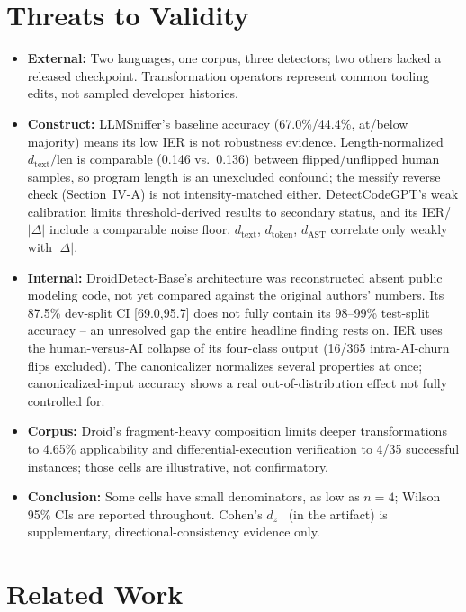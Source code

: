 \documentclass[10pt,conference]{IEEEtran}
\begin{document}
\section{Threats to Validity}

\begin{itemize}
\item \textbf{External:} Two languages, one corpus, three detectors; two others lacked a released checkpoint. Transformation operators represent common tooling edits, not sampled developer histories.
\item \textbf{Construct:} LLMSniffer's baseline accuracy (67.0\%/44.4\%, at/below majority) means its low IER is not robustness evidence. Length-normalized $d_\text{text}/\text{len}$ is comparable (0.146 vs.\ 0.136) between flipped/unflipped human samples, so program length is an unexcluded confound; the messify reverse check (Section~IV-A) is not intensity-matched either. DetectCodeGPT's weak calibration limits threshold-derived results to secondary status, and its IER/$|\Delta|$ include a comparable noise floor. $d_\text{text}$, $d_\text{token}$, $d_\text{AST}$ correlate only weakly with $|\Delta|$.
\item \textbf{Internal:} DroidDetect-Base's architecture was reconstructed absent public modeling code, not yet compared against the original authors' numbers. Its 87.5\% dev-split CI [69.0,95.7] does not fully contain its 98--99\% test-split accuracy -- an unresolved gap the entire headline finding rests on. IER uses the human-versus-AI collapse of its four-class output (16/365 intra-AI-churn flips excluded). The canonicalizer normalizes several properties at once; canonicalized-input accuracy shows a real out-of-distribution effect not fully controlled for.
\item \textbf{Corpus:} Droid's fragment-heavy composition limits deeper transformations to 4.65\% applicability and differential-execution verification to 4/35 successful instances; those cells are illustrative, not confirmatory.
\item \textbf{Conclusion:} Some cells have small denominators, as low as $n{=}4$; Wilson 95\% CIs are reported throughout. Cohen's $d_z$~\cite{cohen1988} (in the artifact) is supplementary, directional-consistency evidence only.
\end{itemize}

\section{Related Work}
\end{document}
